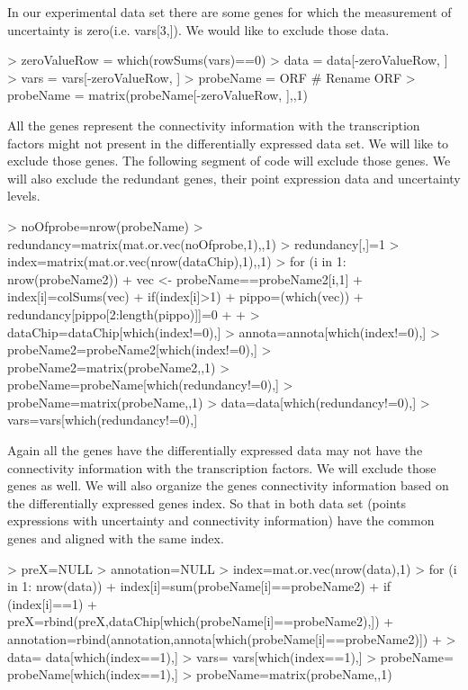 \documentclass[11pt, a4paper, oneside]{article}
\begin{document}
In our experimental data set there are some genes for which the measurement of uncertainty is zero(i.e. vars[3,]). We would like to exclude those data.
\begin{Schunk}
\begin{Sinput}
> zeroValueRow = which(rowSums(vars)==0)
> data = data[-zeroValueRow, ]
> vars = vars[-zeroValueRow, ]
> probeName = ORF # Rename ORF
> probeName = matrix(probeName[-zeroValueRow, ],,1)
\end{Sinput}
\end{Schunk}

All the genes represent the connectivity information with the transcription factors might not present in the differentially expressed data set. We will like to exclude those genes. The following segment of code will exclude those genes. We will also exclude the redundant genes, their point expression data and uncertainty levels.
\begin{Schunk}
\begin{Sinput}
> noOfprobe=nrow(probeName)
> redundancy=matrix(mat.or.vec(noOfprobe,1),,1)
> redundancy[,]=1
> index=matrix(mat.or.vec(nrow(dataChip),1),,1)
> for (i in 1: nrow(probeName2)){
+ 	vec <- probeName==probeName2[i,1]
+ 	index[i]=colSums(vec)
+ 	if(index[i]>1){
+ 		pippo=(which(vec))
+ 		redundancy[pippo[2:length(pippo)]]=0
+ 		}
+ 	}
> dataChip=dataChip[which(index!=0),]
> annota=annota[which(index!=0),]
> probeName2=probeName2[which(index!=0),]
> probeName2=matrix(probeName2,,1)
> probeName=probeName[which(redundancy!=0),]
> probeName=matrix(probeName,,1)
> data=data[which(redundancy!=0),]
> vars=vars[which(redundancy!=0),]
\end{Sinput}
\end{Schunk}

Again all the genes have the differentially expressed data may not have the connectivity information with the transcription factors. We will exclude those genes as well. We will also organize the genes connectivity information based on the differentially expressed genes index. So that in both data set (points expressions with uncertainty and connectivity information) have the common genes and aligned with the same index.

\begin{Schunk}
\begin{Sinput}
> preX=NULL
> annotation=NULL
> index=mat.or.vec(nrow(data),1)
> for (i in 1: nrow(data)){
+ 	index[i]=sum(probeName[i]==probeName2)
+ 	if (index[i]==1)		
+ 		preX=rbind(preX,dataChip[which(probeName[i]==probeName2),])
+ 		annotation=rbind(annotation,annota[which(probeName[i]==probeName2)])
+ }
> data= data[which(index==1),]
> vars= vars[which(index==1),]
> probeName= probeName[which(index==1),]
> probeName=matrix(probeName,,1)
\end{Sinput}
\end{Schunk}
\end{document}
